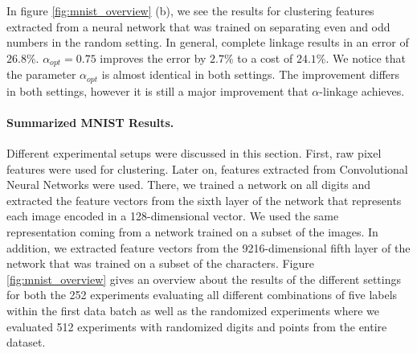 In figure \ref{fig:mnist_overview} (b), we see the results for clustering features extracted from a neural network that was trained on separating even and odd numbers in the random setting. In general, complete linkage results in an error of $26.8\%$. $\alpha_{opt} = 0.75$ improves the error by $2.7\%$ to a cost of $24.1\%$. We notice that the parameter $\alpha_{opt}$ is almost identical in both settings. The improvement differs in both settings, however it is still a major improvement that $\alpha$-linkage achieves.

\paragraph{Summarized MNIST Results.} Different experimental setups were discussed in this section. First, raw pixel features were used for clustering. Later on, features extracted from Convolutional Neural Networks were used. There, we trained a network on all digits and extracted the feature vectors from the sixth layer of the network that represents each image encoded in a 128-dimensional vector. We used the same representation coming from a network trained on a subset of the images. In addition, we extracted feature vectors from the 9216-dimensional fifth layer of the network that was trained on a subset of the characters. Figure \ref{fig:mnist_overview} gives an overview about the results of the different settings for both the 252 experiments evaluating all different combinations of five labels within the first data batch as well as the randomized experiments where we evaluated 512 experiments with randomized digits and points from the entire dataset.

